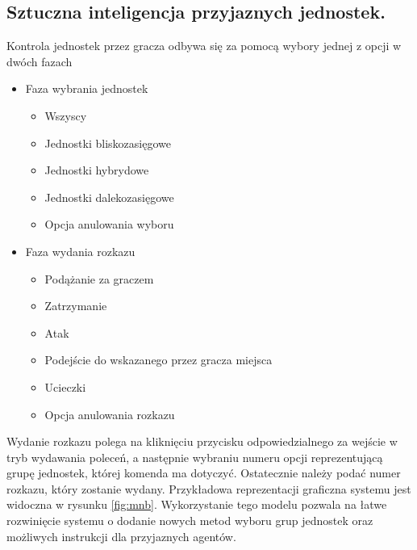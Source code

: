 \subsection{Sztuczna inteligencja przyjaznych jednostek.}

Kontrola jednostek przez gracza odbywa się za pomocą wybory jednej z opcji w dwóch fazach
\begin{itemize}
\item Faza wybrania jednostek
  \begin{itemize}
    \item Wszyscy
    \item Jednostki bliskozasięgowe 
    \item Jednostki hybrydowe
    \item Jednostki dalekozasięgowe
    \item Opcja anulowania wyboru
  \end{itemize}

\item Faza wydania rozkazu
  \begin{itemize}
    \item Podążanie za graczem
    \item Zatrzymanie
    \item Atak
    \item Podejście do wskazanego przez gracza miejsca
    \item Ucieczki
      \item Opcja anulowania rozkazu
  \end{itemize}
\end{itemize}
Wydanie rozkazu polega na kliknięciu przycisku odpowiedzialnego za wejście w tryb wydawania poleceń, a następnie
wybraniu numeru opcji reprezentującą grupę jednostek, której komenda ma dotyczyć. Ostatecznie należy podać numer rozkazu, który zostanie wydany.
Przykładowa reprezentacji graficzna systemu jest widoczna w rysunku \ref{fig:mnb}.
Wykorzystanie tego modelu pozwala na łatwe rozwinięcie systemu o dodanie nowych metod wyboru grup jednostek oraz możliwych instrukcji dla przyjaznych agentów.
